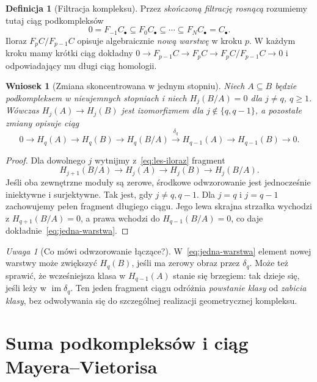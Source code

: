 \documentclass[11pt,a4paper,oneside]{report}
\theoremstyle{plain}
\newtheorem{wniosek}[twierdzenie]{Wniosek}
\theoremstyle{definition}
\newtheorem{definicja}[twierdzenie]{Definicja}
\theoremstyle{remark}
\newtheorem{uwaga}[twierdzenie]{Uwaga}
\begin{document}
\begin{definicja}[Filtracja kompleksu]
\label{def:filtracja-kompleksu}
Przez \emph{skończoną filtrację rosnącą} rozumiemy tutaj ciąg
podkompleksów
\[
 0=F_{-1}C_\bullet\subseteq
 F_0C_\bullet\subseteq\cdots\subseteq
 F_NC_\bullet=C_\bullet.
\]
Iloraz $F_pC/F_{p-1}C$ opisuje
algebraicznie \emph{nową warstwę}
w kroku $p$. W każdym kroku mamy
krótki ciąg dokładny
$0\to F_{p-1}C\to F_pC\to
F_pC/F_{p-1}C\to0$
i odpowiadający mu długi ciąg homologii.
\end{definicja}

\begin{wniosek}[Zmiana skoncentrowana w jednym stopniu]
\label{wn:filtracja-jeden-stopien}
Niech $A\subseteq B$ będzie podkompleksem
w nieujemnych stopniach i niech
$H_j(B/A)=0$ dla $j\ne q$, $q\geq1$.
Wówczas $H_j(A)\to H_j(B)$ jest
izomorfizmem dla $j\notin\{q,q-1\}$,
a pozostałe zmiany opisuje ciąg
\begin{equation}\label{eq:jedna-warstwa}
 0\to H_q(A)\to H_q(B)\to H_q(B/A)
 \xrightarrow{\delta_q}H_{q-1}(A)
 \to H_{q-1}(B)\to0.
\end{equation}
\end{wniosek}
\begin{proof}
Dla dowolnego $j$ wytnijmy z~\eqref{eq:les-iloraz}
fragment
\[
 H_{j+1}(B/A)\to H_j(A)\to H_j(B)\to H_j(B/A).
\]
Jeśli oba zewnętrzne moduły są zerowe,
środkowe odwzorowanie jest jednocześnie
iniektywne i surjektywne.
Tak jest, gdy $j\ne q,q-1$.
Dla $j=q$ i $j=q-1$ zachowujemy
pełen fragment długiego ciągu.
Jego lewa skrajna strzałka wychodzi
z $H_{q+1}(B/A)=0$, a prawa
wchodzi do $H_{q-1}(B/A)=0$,
co daje dokładnie~\eqref{eq:jedna-warstwa}.
\end{proof}

\begin{uwaga}[Co mówi odwzorowanie łączące?]
W~\eqref{eq:jedna-warstwa} element
nowej warstwy może zwiększyć
$H_q(B)$, jeśli ma zerowy obraz
przez $\delta_q$. Może też sprawić,
że wcześniejsza klasa w
$H_{q-1}(A)$ stanie się brzegiem:
tak dzieje się, jeśli leży w
$\operatorname{im}\delta_q$.
Ten jeden fragment ciągu odróżnia
\emph{powstanie klasy} od
\emph{zabicia klasy}, bez odwoływania
się do szczególnej realizacji
geometrycznej kompleksu.
\end{uwaga}
\section{Suma podkompleksów i ciąg Mayera--Vietorisa}
\label{sec:mv-algebraiczny}
\end{document}
